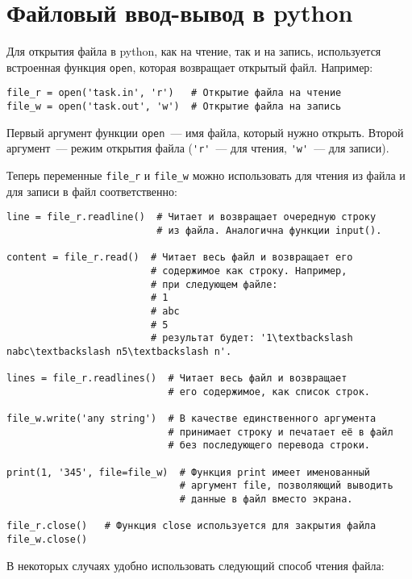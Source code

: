 \documentclass[a4paper, 12pt]{article}
\begin{document}
\section*{Файловый ввод-вывод в python}

Для открытия файла в python, как на чтение, так и на запись, используется встроенная функция \lstinline{open}, которая возвращает открытый файл. Например:
\begin{lstlisting}[texcl]
file_r = open('task.in', 'r')   # Открытие файла на чтение
file_w = open('task.out', 'w')  # Открытие файла на запись
\end{lstlisting}

Первый аргумент функции \lstinline{open}~--- имя файла, который нужно открыть. Второй аргумент~--- режим открытия файла (\lstinline{'r'}~--- для чтения, \lstinline{'w'}~--- для записи).

Теперь переменные \lstinline{file_r} и \lstinline{file_w} можно использовать для чтения из файла и для записи в файл соответственно:

\begin{lstlisting}[texcl]
line = file_r.readline()  # Читает и возвращает очередную строку
                          # из файла. Аналогична функции input().

content = file_r.read()  # Читает весь файл и возвращает его
                         # содержимое как строку. Например,
                         # при следующем файле:
                         # 1
                         # abc
                         # 5
                         # результат будет: '1\textbackslash nabc\textbackslash n5\textbackslash n'.

lines = file_r.readlines()  # Читает весь файл и возвращает
                            # его содержимое, как список строк.

file_w.write('any string')  # В качестве единственного аргумента
                            # принимает строку и печатает её в файл
                            # без последующего перевода строки.

print(1, '345', file=file_w)  # Функция print имеет именованный
                              # аргумент file, позволяющий выводить
                              # данные в файл вместо экрана.

file_r.close()   # Функция close используется для закрытия файла
file_w.close()
\end{lstlisting}

В некоторых случаях удобно использовать следующий способ чтения файла:
\end{document}
